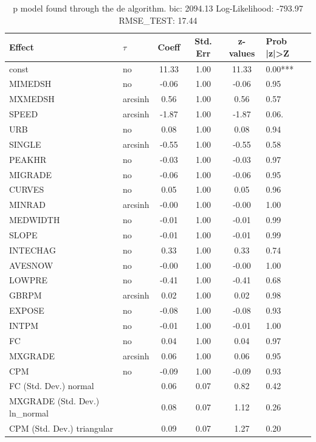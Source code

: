 \begin{table}
	\caption{p model found through the de algorithm. bic: 2094.13 Log-Likelihood: -793.97 RMSE_TEST: 17.44}
	\begin{center}
		\begin{tabular}{|l|l|c|c|c|l|}
			\hline
			Effect & $\tau$ & Coeff & Std. Err & z-values & Prob |z|>Z \\
			\hline
			const & no & 11.33 & 1.00 & 11.33 & 0.00*** \\
			\hline
			MIMEDSH & no & -0.06 & 1.00 & -0.06 & 0.95 \\
			\hline
			MXMEDSH & arcsinh & 0.56 & 1.00 & 0.56 & 0.57 \\
			\hline
			SPEED & arcsinh & -1.87 & 1.00 & -1.87 & 0.06. \\
			\hline
			URB & no & 0.08 & 1.00 & 0.08 & 0.94 \\
			\hline
			SINGLE & arcsinh & -0.55 & 1.00 & -0.55 & 0.58 \\
			\hline
			PEAKHR & no & -0.03 & 1.00 & -0.03 & 0.97 \\
			\hline
			MIGRADE & no & -0.06 & 1.00 & -0.06 & 0.95 \\
			\hline
			CURVES & no & 0.05 & 1.00 & 0.05 & 0.96 \\
			\hline
			MINRAD & arcsinh & -0.00 & 1.00 & -0.00 & 1.00 \\
			\hline
			MEDWIDTH & no & -0.01 & 1.00 & -0.01 & 0.99 \\
			\hline
			SLOPE & no & -0.01 & 1.00 & -0.01 & 0.99 \\
			\hline
			INTECHAG & no & 0.33 & 1.00 & 0.33 & 0.74 \\
			\hline
			AVESNOW & no & -0.00 & 1.00 & -0.00 & 1.00 \\
			\hline
			LOWPRE & no & -0.41 & 1.00 & -0.41 & 0.68 \\
			\hline
			GBRPM & arcsinh & 0.02 & 1.00 & 0.02 & 0.98 \\
			\hline
			EXPOSE & no & -0.08 & 1.00 & -0.08 & 0.93 \\
			\hline
			INTPM & no & -0.01 & 1.00 & -0.01 & 1.00 \\
			\hline
			FC & no & 0.04 & 1.00 & 0.04 & 0.97 \\
			\hline
			MXGRADE & arcsinh & 0.06 & 1.00 & 0.06 & 0.95 \\
			\hline
			CPM & no & -0.09 & 1.00 & -0.09 & 0.93 \\
			\hline
			FC (Std. Dev.) normal &  & 0.06 & 0.07 & 0.82 & 0.42 \\
			\hline
			MXGRADE (Std. Dev.) ln_normal &  & 0.08 & 0.07 & 1.12 & 0.26 \\
			\hline
			CPM (Std. Dev.) triangular &  & 0.09 & 0.07 & 1.27 & 0.20 \\
			\hline
		\end{tabular}
	\end{center}
\end{table}